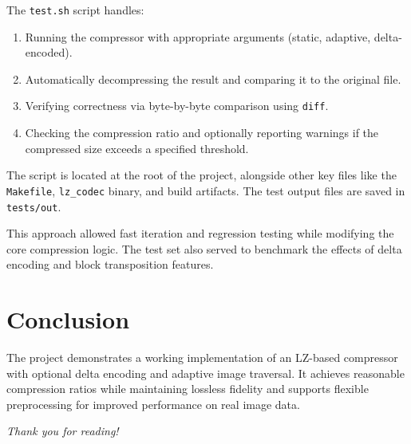 \documentclass[a4paper,12pt]{article}
\begin{document}
    The \texttt{test.sh} script handles:
    \begin{enumerate}
        \item Running the compressor with appropriate arguments (static, adaptive, delta-encoded).
        \item Automatically decompressing the result and comparing it to the original file.
        \item Verifying correctness via byte-by-byte comparison using \texttt{diff}.
        \item Checking the compression ratio and optionally reporting warnings if the compressed size exceeds a specified threshold.
    \end{enumerate}

    The script is located at the root of the project, alongside other key files like the \texttt{Makefile}, \texttt{lz\_codec} binary, and build artifacts. The test output files are saved in \texttt{tests/out}.

    This approach allowed fast iteration and regression testing while modifying the core compression logic. The test set also served to benchmark the effects of delta encoding and block transposition features.



    \section{Conclusion}
    The project demonstrates a working implementation of an LZ-based compressor with optional delta encoding and adaptive image traversal. It achieves reasonable compression ratios while maintaining lossless fidelity and supports flexible preprocessing for improved performance on real image data.

    \vfill
    \begin{center}
        \textit{Thank you for reading!}
    \end{center}
\end{document}
